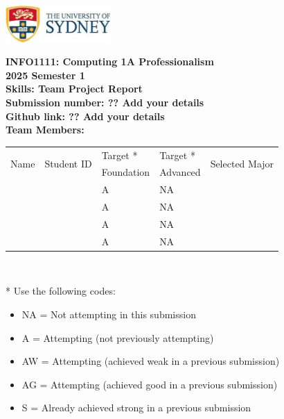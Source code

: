 \documentclass[a4paper, 11pt]{report}
\begin{document}
\begin{titlepage}
\begin{flushright}
\includegraphics[width=4cm]{USyd}\\[1cm]
\end{flushright}

\begin{centering}
\textbf{\huge INFO1111: Computing 1A Professionalism}\\[0.75cm]
\textbf{\huge 2025 Semester 1}\\[2cm]
\textbf{\huge Skills: Team Project Report}\\[2cm]

\textbf{\large Submission number: ?? Add your details}\\[0.5cm]
\textbf{\large Github link: ?? Add your details}\\[0.75cm]
\textbf{\huge Team Members:}\\[0.75cm]

\begin{tabular}{|p{}|p{}|p{}|p{}|p{}|}
	\hline
	\multirow{2}{*}{Name} & \multirow{2}{*}{Student ID} & Target * & Target * & \multirow{2}{*}{Selected Major} \\
	 & & Foundation & Advanced & \\
	\hline
	\hline
	\raggedright{\studA} & \sidA & A & NA & \majA \\
	\hline
	\raggedright{\studB} & \sidB & A & NA & \majB \\
	\hline
	\raggedright{\studC} & \sidC & A & NA & \majC \\
	\hline
	\raggedright{\studD} & \sidD & A & NA & \majD \\
	\hline
\end{tabular}
\\[0.5cm]
\end{centering}

* Use the following codes:
\begin{itemize}
\setlength\itemsep{0em}
\item NA = Not attempting in this submission
\item A = Attempting (not previously attempting)
\item AW = Attempting (achieved weak in a previous submission) 
\item AG = Attempting (achieved good in a previous submission)
\item S = Already achieved strong in a previous submission
\end{itemize}

\thispagestyle{empty}
\end{titlepage}
\end{document}
